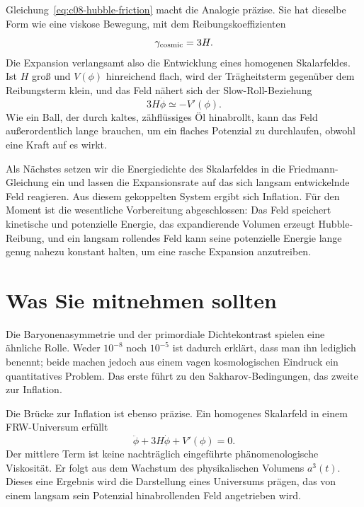 Gleichung~\eqref{eq:c08-hubble-friction} macht die Analogie präzise. Sie hat dieselbe Form wie eine viskose Bewegung, mit dem Reibungskoeffizienten
\begin{equation}
\gamma_{\rm cosmic}=3H.
\end{equation}
Die Expansion verlangsamt also die Entwicklung eines homogenen Skalarfeldes. Ist \(H\) groß und \(V(\phi)\) hinreichend flach, wird der Trägheitsterm gegenüber dem Reibungsterm klein, und das Feld nähert sich der Slow-Roll-Beziehung
\begin{equation}
3H\dot\phi\simeq-V'(\phi).
\end{equation}
Wie ein Ball, der durch kaltes, zähflüssiges Öl hinabrollt, kann das Feld außerordentlich lange brauchen, um ein flaches Potenzial zu durchlaufen, obwohl eine Kraft auf es wirkt.

Als Nächstes setzen wir die Energiedichte des Skalarfeldes in die Friedmann-Gleichung ein und lassen die Expansionsrate auf das sich langsam entwickelnde Feld reagieren. Aus diesem gekoppelten System ergibt sich Inflation. Für den Moment ist die wesentliche Vorbereitung abgeschlossen: Das Feld speichert kinetische und potenzielle Energie, das expandierende Volumen erzeugt Hubble-Reibung, und ein langsam rollendes Feld kann seine potenzielle Energie lange genug nahezu konstant halten, um eine rasche Expansion anzutreiben.

\section{Was Sie mitnehmen sollten}

Die Baryonenasymmetrie und der primordiale Dichtekontrast spielen eine ähnliche Rolle. Weder \(10^{-8}\) noch \(10^{-5}\) ist dadurch erklärt, dass man ihn lediglich benennt; beide machen jedoch aus einem vagen kosmologischen Eindruck ein quantitatives Problem. Das erste führt zu den Sakharov-Bedingungen, das zweite zur Inflation.

Die Brücke zur Inflation ist ebenso präzise. Ein homogenes Skalarfeld in einem FRW-Universum erfüllt
\[
\ddot\phi+3H\dot\phi+V'(\phi)=0.
\]
Der mittlere Term ist keine nachträglich eingeführte phänomenologische Viskosität. Er folgt aus dem Wachstum des physikalischen Volumens \(a^3(t)\). Dieses eine Ergebnis wird die Darstellung eines Universums prägen, das von einem langsam sein Potenzial hinabrollenden Feld angetrieben wird.